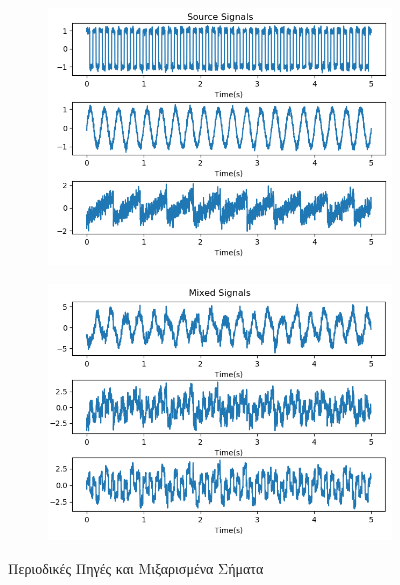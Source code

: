 \begin{figure}[H]
    \centering
    \begin{subfigure}{0.48 \textwidth}
        \centering
       \includegraphics[width=\textwidth]{fwto/Signals_ica_1.png} \en
        \caption{} \gr
        \label{fig:5.1a}
    \end{subfigure}%
    \hfill
    \begin{subfigure}{0.48 \textwidth}
        \centering
       \includegraphics[width=\textwidth]{fwto/Mixed_ica_1.png}
        \en
        \caption{} \gr
        \label{fig:5.1b}
    \end{subfigure}%
    \gr
    \caption{Περιοδικές Πηγές και Μιξαρισμένα Σήματα}
\end{figure}
